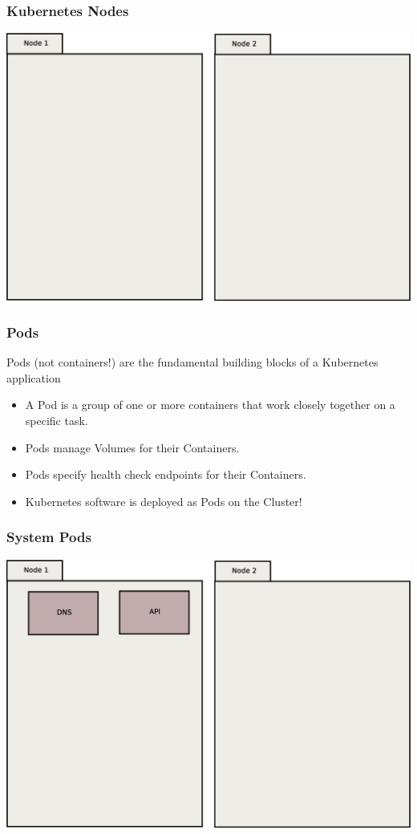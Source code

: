 \documentclass{beamer}
\begin{document}
\begin{frame}
    \frametitle{Kubernetes Nodes}
    \includegraphics[width=\textwidth,height=0.85\textheight,keepaspectratio]{graphics/00-nodes.eps}
\end{frame}

\begin{frame}
    \frametitle{Pods}
    Pods (not containers!) are the fundamental building blocks of a Kubernetes application
    \begin{itemize}
        \item A Pod is a group of one or more containers that work closely together on a specific task.
        \item Pods manage Volumes for their Containers.
        \item Pods specify health check endpoints for their Containers.
        \item Kubernetes software is deployed as Pods on the Cluster!
    \end{itemize}
\end{frame}

\begin{frame}
    \frametitle{System Pods}
    \includegraphics[width=\textwidth,height=0.85\textheight,keepaspectratio]{graphics/01-systemPods.eps}
\end{frame}
\end{document}
